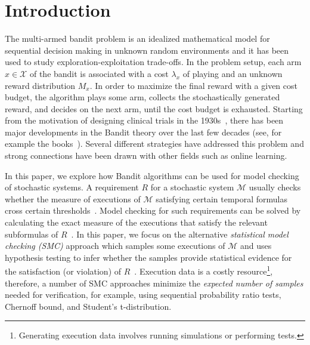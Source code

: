 \documentclass[11pt]{article}
\theoremstyle{definition}
\newcommand{\sayan}[1]{\textcolor{blue}{#1}}
\newcommand{\M}{\mathcal{M}}
\newcommand{\X}{\mathcal{X}}
\begin{document}
%
\section{Introduction}
\label{sec:intro}
The  multi-armed bandit problem  is an idealized mathematical model for sequential decision making in unknown random environments and it has been used to study exploration-exploitation trade-offs.
%
In the problem setup, each arm $x \in \X$ of the bandit is associated with a cost $\lambda_x$ of playing and an unknown reward distribution $M_x$. In order to maximize the final reward with a given cost budget, the algorithm  plays some arm, collects the stochastically generated reward, and decides on the next arm,  until the cost budget is exhausted.
%
Starting from the motivation of designing clinical trials in the 1930s~\cite{thompson1935theory,thompson1933likelihood,robbins1952some}, there has been major developments in the Bandit theory over the last few decades (see, for example the books~\cite{munos:hal-2014,Bubeck:2011,Bubeck12}).
Several different strategies have addressed this problem and
 strong connections have been drawn with other fields such as online learning.
%

In this paper, we explore how Bandit algorithms can be used for  model checking of stochastic systems.
%
%
A requirement $R$ for a stochastic system $\M$  usually checks whether the measure of executions of $\M$ satisfying certain temporal formulas cross certain thresholds~\cite{younes2002probabilistic,GburekB18}.
%
Model checking for such requirements can be solved by calculating the exact measure of the executions that satisfy the relevant subformulas of $R$~\cite{BustanRV04,HermannsWZ08,JansenKOSZ07,Kwiatkowska:book2004}.
%
In this paper, we focus on the alternative {\em statistical model checking (SMC)\/}
approach which samples some executions of $\M$ and uses hypothesis testing to infer whether the samples provide
statistical evidence for the satisfaction (or violation) of $R$~\cite{younes2002probabilistic,Sen:2005:SMC,Younes05}.
%
Execution data is a costly resource\footnote{Generating execution data  involves running simulations or performing tests.},  therefore, a number of SMC approaches minimize the {\em expected number of samples\/}  needed for verification, for example, using sequential probability ratio tests, Chernoff bound, and Student's t-distribution.
%
%
\end{document}
